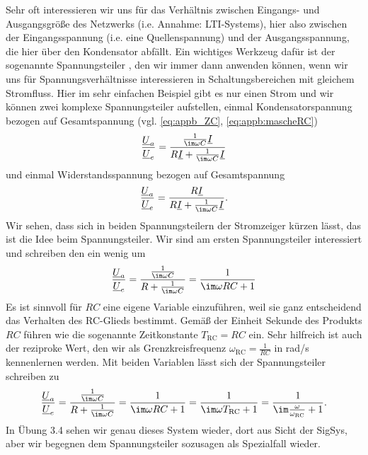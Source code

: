 Sehr oft interessieren wir uns für das Verhältnis zwischen Eingangs- und Ausgangsgröße
des Netzwerks (i.e. Annahme: LTI-Systems), hier also zwischen der Eingangsspannung
(i.e. eine Quellenspannung) und der Ausgangsspannung, die hier über den Kondensator
abfällt.
Ein wichtiges Werkzeug dafür ist der sogenannte Spannungsteiler
\cite[Kap. 3.1.2, 11.2.1]{Marinescu2020}, den wir immer dann anwenden können,
wenn wir uns für Spannungsverhältnisse interessieren in Schaltungsbereichen mit
gleichem Stromfluss.
Hier im sehr einfachen Beispiel gibt es nur einen Strom und wir können
zwei komplexe Spannungsteiler aufstellen, einmal Kondensatorspannung bezogen auf
Gesamtspannung (vgl. \eqref{eq:appb_ZC}, \eqref{eq:appb:mascheRC})
\begin{align}
\frac{\underline{U}_a}{\underline{U}_e} = \frac{\frac{1}{\im \omega C}\underline{I}}{R \underline{I}+\frac{1}{\im \omega C} \underline{I}}
\end{align}
und einmal Widerstandsspannung bezogen auf Gesamtspannung
\begin{align}
\frac{\underline{U}_a}{\underline{U}_e} = \frac{R\underline{I}}{R \underline{I}+\frac{1}{\im \omega C} \underline{I}}.
\end{align}
Wir sehen, dass sich in beiden Spannungsteilern der Stromzeiger kürzen lässt,
das ist die Idee beim Spannungsteiler.
Wir sind am ersten Spannungsteiler interessiert und schreiben den ein wenig
um
\begin{align}
\frac{\underline{U}_a}{\underline{U}_e} = \frac{\frac{1}{\im \omega C}}{R +\frac{1}{\im \omega C}}=
\frac{1}{\im \omega R C + 1}
\end{align}
Es ist sinnvoll für $RC$ eine eigene Variable einzuführen, weil sie ganz entscheidend
das Verhalten des RC-Glieds bestimmt.
Gemäß der Einheit Sekunde des Produkts $R C$ führen wie die sogenannte Zeitkonstante
$T_\text{RC} = R C$ ein.
%
Sehr hilfreich ist auch der reziproke Wert, den wir als Grenzkreisfrequenz
$\omega_\text{RC} = \frac{1}{R C}$ in rad/s kennenlernen werden.
%
Mit beiden Variablen lässt sich der Spannungsteiler schreiben zu
\begin{align}
\frac{\underline{U}_a}{\underline{U}_e} = \frac{\frac{1}{\im \omega C}}{R +\frac{1}{\im \omega C}}=
\frac{1}{\im \omega R C + 1} =
\frac{1}{\im \omega T_\text{RC} + 1} =
\frac{1}{\im \frac{\omega}{\omega_\text{RC}} + 1}.
\end{align}
In Übung 3.4 sehen wir genau dieses System wieder, dort aus Sicht der SigSys, aber
wir begegnen dem Spannungsteiler sozusagen als Spezialfall wieder.
